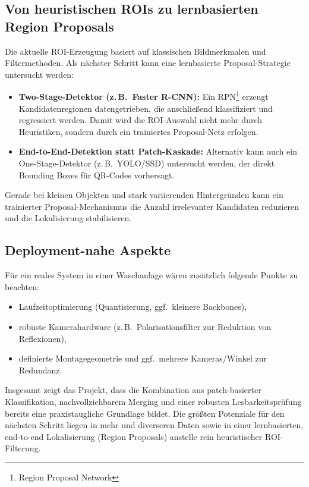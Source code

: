 \subsection{Von heuristischen ROIs zu lernbasierten Region Proposals}
Die aktuelle \ac{ROI}-Erzeugung basiert auf klassischen Bildmerkmalen und Filtermethoden. Als nächster Schritt kann eine lernbasierte Proposal-Strategie untersucht werden:
\begin{itemize}
    \item \textbf{Two-Stage-Detektor (z.\,B.\ Faster R-\ac{CNN}):} Ein RPN\footnote{Region Proposal Network} erzeugt Kandidatenregionen datengetrieben, die anschließend klassifiziert und regressiert werden. Damit wird die \ac{ROI}-Auswahl nicht mehr durch Heuristiken, sondern durch ein trainiertes Proposal-Netz erfolgen.
    \item \textbf{End-to-End-Detektion statt Patch-Kaskade:} Alternativ kann auch ein One-Stage-Detektor (z.\,B.\ YOLO/SSD) untersucht werden, der direkt Bounding Boxes für \ac{QR}-Codes vorhersagt.
\end{itemize}
Gerade bei kleinen Objekten und stark variierenden Hintergründen kann ein trainierter Proposal-Mechanismus die Anzahl irrelevanter Kandidaten reduzieren und die Lokalisierung stabilisieren.

\subsection{Deployment-nahe Aspekte}
Für ein reales System in einer Waschanlage wären zusätzlich folgende Punkte zu beachten:
\begin{itemize}
    \item Laufzeitoptimierung (Quantisierung, ggf.\ kleinere Backbones),
    \item robuste Kamerahardware (z.\,B.\ Polarisationsfilter zur Reduktion von Reflexionen),
    \item definierte Montagegeometrie und ggf.\ mehrere Kameras/Winkel zur Redundanz.
\end{itemize}

\bigskip
Insgesamt zeigt das Projekt, dass die Kombination aus patch-basierter Klassifikation, nachvollziehbarem Merging und einer robusten Lesbarkeitsprüfung bereits eine praxistaugliche Grundlage bildet. Die größten Potenziale für den nächsten Schritt liegen in mehr und diverseren Daten sowie in einer lernbasierten, end-to-end Lokalisierung (Region Proposals) anstelle rein heuristischer \ac{ROI}-Filterung.

